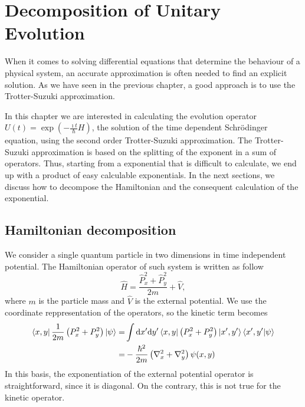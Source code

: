 \chapter{Decomposition of Unitary Evolution}
When it comes to solving differential equations that determine the behaviour of a physical system, an accurate approximation is often needed to find an explicit solution. As we have seen in the previous chapter, a good approach is to use the Trotter-Suzuki approximation. 

In this chapter we are interested in calculating the evolution operator $U(t) = \exp \left( - \frac{\imath t}{\hbar} H \right)$, the solution of the time dependent Schr\"odinger equation, using the second order Trotter-Suzuki approximation. The Trotter-Suzuki approximation is based on the splitting of the exponent in a sum of operators. Thus, starting from a exponential that is difficult to calculate, we end up with a product of easy calculable exponentials. In the next sections, we discuss how to decompose the Hamiltonian and the consequent calculation of the exponential.

\section{Hamiltonian decomposition}
We consider a single quantum particle in two dimensions in time independent potential. The Hamiltonian operator of such system is written as follow
\begin{equation} \label{eq:hamiltonian-implementation}
\hat{H} = \frac{\hat{P}_x^2 + \hat{P}_y^2}{2m} + \hat{V},
\end{equation}
where $m$ is the particle mass and $\hat{V}$ is the external potential.
We use the coordinate reppresentation of the operators, so the kinetic term becomes
\begin{subequations}
\begin{align}
\bra{x,y} \frac{1}{2m} \left( P_x^2 + P_y^2 \right) \ket{\psi} = & \int \mathrm{d}x' \mathrm{d}y' \bra{x,y} \left( P_x^2 + P_y^2 \right) \ket{x',y'} \braket{x',y'|\psi} \label{eq:tot-momentum1} \\
= & - \frac{\hbar^2}{2m} \left( \nabla_x^2 + \nabla_y^2 \right) \psi(x,y) \label{eq:tot_momentum}
\end{align}
\end{subequations}
In this basis, the exponentiation of the external potential operator is straightforward, since it is diagonal. On the contrary, this is not true for the kinetic operator.

